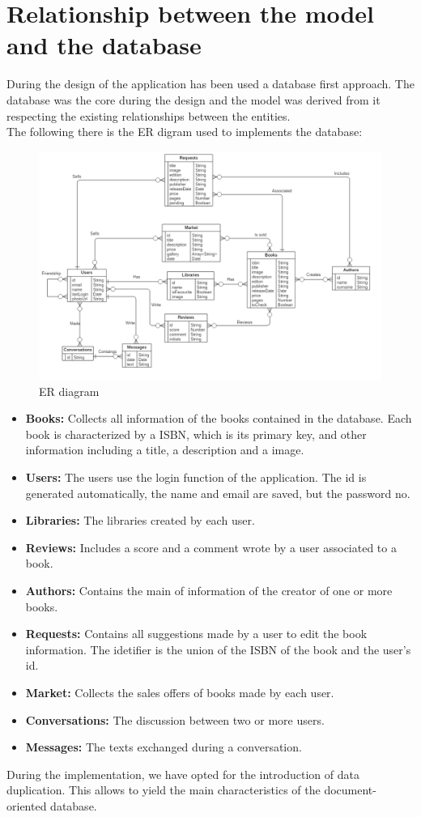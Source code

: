 \section{Relationship between the model and the database}
During the design of the application has been used a database first approach. The database was the core during the design and the model was derived from it 
respecting the existing relationships between the entities.\\
The following there is the ER digram used to implements the database:
\begin{figure}[!h]
    \centering
    \includegraphics[scale=0.43]{images/er-diagram.png}
    \caption{ER diagram}
    \label{ref:erdiagram}
\end{figure}
\begin{itemize}
    \item
    \textbf{Books:} Collects all information of the books contained in the database. Each book is characterized  by a ISBN, which is its primary key, and other information including a title, a description and a image.
    \item
    \textbf{Users:} The users use the login function of the application. The id is generated automatically, the name and email are saved, but the password no.
    \item
    \textbf{Libraries:} The libraries created by each user.
    \item
    \textbf{Reviews:} Includes a score and a comment wrote by a user associated to a book.
    \item
    \textbf{Authors:} Contains the main of information of the creator of one or more books.
    \item
    \textbf{Requests:} Contains all suggestions made by a user to edit the book information. The idetifier is the union of the ISBN of the book and the user's id.
    \item
    \textbf{Market:} Collects the sales offers of books made by each user.
    \item
    \textbf{Conversations:} The discussion between two or more users.
    \item
    \textbf{Messages:} The texts exchanged during a conversation.
\end{itemize}
During the implementation, we have opted for the introduction of data duplication. This allows to yield the main characteristics of the document-oriented database.
\clearpage

